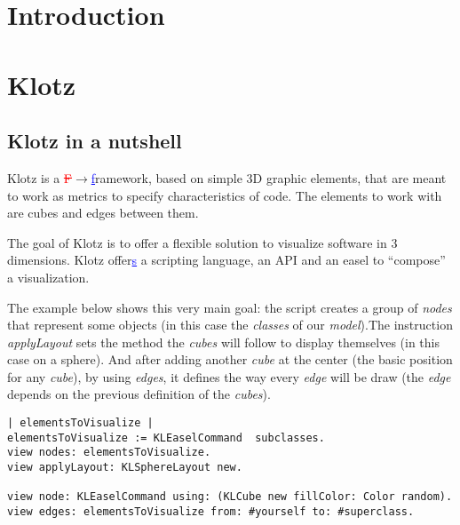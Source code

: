 \documentclass[runningheads]{llncs}
\newcommand{\ra}{$\rightarrow$}
\newcommand{\ins}[1]{\textcolor{blue}{\uline{#1}}} %
\newcommand{\chg}[2]{\textcolor{red}{\sout{#1}}{\ra}\textcolor{blue}{\uline{#2}}} %
\newcommand{\seclabel}[1]{\label{sec:#1}}
\begin{document}

\section{Introduction} \seclabel{introduction}


\section{Klotz} \seclabel{klotz}

\subsection{Klotz in a nutshell} \seclabel{nutshell}
Klotz is a \chg{F}{f}ramework, based on simple 3D graphic elements,
that are meant to work as metrics to specify characteristics of
code. The elements to work with are cubes and edges between them.

The goal of Klotz is to offer a flexible solution to visualize software 
in 3 dimensions. Klotz offer\ins{s} a scripting language, an API and an easel to 
``compose'' a visualization. 

The example below shows this very main goal: the script creates a group of
\emph{nodes} that represent some objects (in this case the \emph{classes} 
of our \emph{model}).The instruction \emph{applyLayout} sets the method 
the \emph{cubes} will follow to display themselves (in this case on a 
sphere). And after adding another \emph{cube} at the center (the basic 
position for any \emph{cube}), by using \emph{edges}, it defines the way 
every \emph{edge} will be draw (the \emph{edge} depends on the previous 
definition of the \emph{cubes}).

\begin{lstlisting}
| elementsToVisualize |
elementsToVisualize := KLEaselCommand  subclasses.
view nodes: elementsToVisualize.
view applyLayout: KLSphereLayout new.

view node: KLEaselCommand using: (KLCube new fillColor: Color random).
view edges: elementsToVisualize from: #yourself to: #superclass.   
\end{lstlisting}
\end{document}
